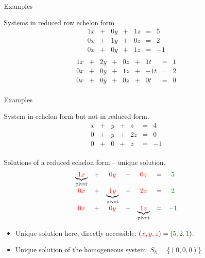 \documentclass{beamer}
\begin{document}
\begin{frame}{Examples}
  
  \begin{exampleblock}{Systems in reduced row echelon form}
    \[
    \begin{array}{ccccccc}
    1x & + & 0y & + & 1z  & = & 5\\
    0x & + & 1y & + & 0z & = & 2\\
    0x & + & 0y & + & 1z  & = & -1\\    
    \end{array}
    \]\[
    \begin{array}{ccccccccc}
        1x & + & 2y & + & 0z  &  + & 1t & = & 1\\
        0x & + & 0y & +  &  1z  &  + & -1t & = & 2\\
        0x & + & 0y & +  &  0z  &  + & 0t & = & 0\\    
    \end{array}
    \]
  \end{exampleblock}
\end{frame}

\begin{frame}{Examples}

  \begin{exampleblock}{System in echelon form but not in reduced form.}
    \[\begin{array}{ccccccc}
    x & + & y & + & z  & = & 4\\
    0 & + & y & + & 2z & = & 0\\
    0 & + & 0 & + & z  & = & -1\\    
    \end{array}\]
  \end{exampleblock}
  
\end{frame}

\begin{frame}{Solutions of a reduced echelon form -- unique solution.}
  \[\begin{array}{ccccccc}
             \underbrace{ \color{red} 1x}_{\textnormal{pivot}} & + & {\color{red} 0 y} & + & {\color{red} 0z}  & = & {\color{darkgreen}5}\\
             {\color{red}0 x}& + & \underbrace{ \color{red} 1y}_{\textnormal{pivot}} & + &{\color{red}2z} & = & {\color{darkgreen}2}\\
             {\color{red}0 x}& + & {\color{red}0 y}& + & \underbrace{\color{red} 1z}_{\textnormal{pivot}}  & = & {\color{darkgreen}-1}\\    
  \end{array}\]

  \begin{itemize}
  \item<2-> Unique solution here, directly accessible: $({\color{red}x, y, z}) = ({\color{darkgreen} 5, 2, 1})$.
  \item<3-> Unique solution of the homogeneous system: $S_h = \{(0,0,0)\}$
  \end{itemize}

\end{frame}
\end{document}
